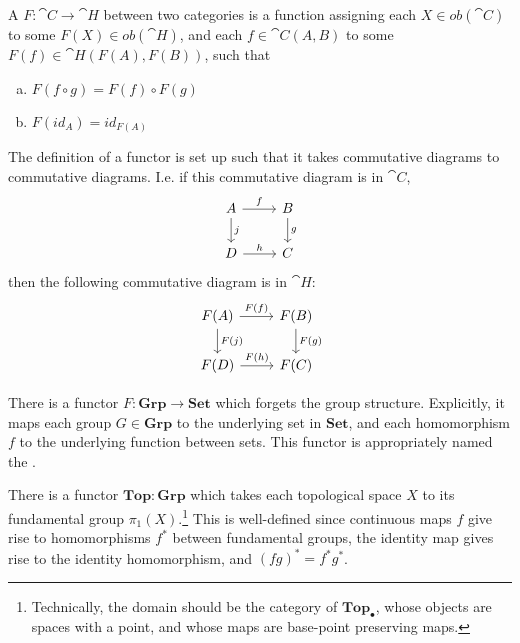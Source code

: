 \begin{definition}
A  $F:\cat{C}\rightarrow\cat{H}$ between two categories is a function assigning each $X\in ob(\cat{C})$ to some $F(X)\in ob(\cat{H})$, and each $f\in \cat{C}(A,B)$ to some $F(f)\in \cat{H}(F(A),F(B))$, such that
\begin{enumerate}[(a)]
\item $F(f\circ g)=F(f)\circ F(g)$
\item $F(id_A)=id_{F(A)}$
\end{enumerate}
\end{definition}
The definition of a functor is set up such that it takes commutative diagrams to commutative diagrams. I.e. if this commutative diagram is in $\cat{C}$,
\[\begin{tikzcd}
A \arrow[r, "f"] \arrow[d, "j"] & B \arrow[d, "g"] \\
D \arrow[r, "h"]                & C               
\end{tikzcd}\]
then the following commutative diagram is in $\cat{H}$:
\[\begin{tikzcd}
F(A) \arrow[r, "F(f)"] \arrow[d, "F(j)"] & F(B) \arrow[d, "F(g)"] \\
F(D) \arrow[r, "F(h)"]                   & F(C)                  
\end{tikzcd}\]

\begin{example}
There is a functor $F:\mathbf{Grp}\rightarrow \mathbf{Set}$ which forgets the group structure. Explicitly, it maps each group $G\in \mathbf{Grp}$ to the underlying set in $\mathbf{Set}$, and each homomorphism $f$ to the underlying function between sets. This functor is appropriately named the .
\end{example}

\begin{example}
There is a functor $\mathbf{Top}:\mathbf{Grp}$ which takes each topological space $X$ to its fundamental group $\pi_1(X)$.\footnote{Technically, the domain should be the category of  $\mathbf{Top_{\bullet}}$, whose objects are spaces with a point, and whose maps are base-point preserving maps.} This is well-defined since continuous maps $f$ give rise to homomorphisms $f^*$ between fundamental groups, the identity map gives rise to the identity homomorphism, and $(fg)^*=f^*g^*$.
\end{example}

